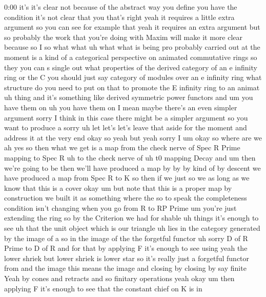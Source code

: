 \begin{unfinished}{0:00}
it's  it's  clear
not  because  of  the  abstract  way  you
define  you  have  the  condition  it's  not
clear  that  you  that's  right  yeah  it
requires  a  little  extra  argument  so  you
can  see  for  example
that  yeah
it  requires  an  extra  argument
but  so  probably  the  work  that  you're
doing  with  Maxim  will  make  it  more  clear
because  so  I  so  what  what  uh  what  what
is  being  pro  probably  carried  out  at  the
moment  is  a  kind  of  a  categorical
perspective  on  animated  commutative
rings  so  they  you  can  s  single  out  what
properties  of  the  derived  category  of  an
e  infinity  ring  or  the  C  you  should  just
say  category  of  modules  over  an  e
infinity  ring  what  structure  do  you  need
to  put  on  that  to  promote  the  E  infinity
ring  to  an  animat
uh  thing  and  it's  something  like  derived
symmetric  power
functors  and  um  you  have  them
on
uh  you  have  them  on  I  mean  maybe  there's
an  even  simpler  argument  sorry  I  think
in  this  case  there  might  be  a  simpler
argument  so  you  want  to  produce  a  sorry
uh  let  let's  let's  leave  that  aside  for
the  moment  and  address  it  at  the  very
end  okay  so  yeah  but  yeah  sorry  I
um  okay  so  where  are  we  ah  yes  so  then
what  we
get  is  a  map
from  the  check
nerve  of  Spec  R
Prime  mapping  to  Spec
R  uh  to  the  check
nerve  of  uh  t0  mapping
Decay  and  um  then  we're  going  to  be  then
we'll  have  produced  a  map  by  by  by  kind
of  by  descent  we  have  produced  a  map
from  Spec  R  to  K  so  then  if  we  just  so
we  as  long  as  we  know  that  this  is  a
cover
okay  um  but  note  that  this  is  a  proper
map  by  construction  we  built  it  as
something  where  the  so  to  speak  the
completeness  condition  isn't  changing
when  you  go  from  R  to  RP  Prime  um  you're
just  extending  the  ring  so  by  the
Criterion  we  had  for
shable  uh  things  it's  enough  to
see  uh  that  the  unit  object  which  is  our
triangle  uh  lies  in  the  category
generated  by  the  image  of  a  so  in  the
image  of  the  the  forgetful  functor  uh
sorry
D  of  R  Prime  to  D  of
R  and  for  that  by  applying  F  it's  enough
to
see  using  yeah  the  lower  shriek  but
lower  shriek  is  lower  star  so  it's
really  just  a  forgetful  functor  from  and
the  image  this  means  the  image  and
closing  by  closing  by  say  finite  Yeah  by
cones  and  retracts  and  so  finitary
operations  yeah
okay  um  then  applying  F  it's  enough  to
see  that  the  constant  chief  on  K  is  in

\end{unfinished}
